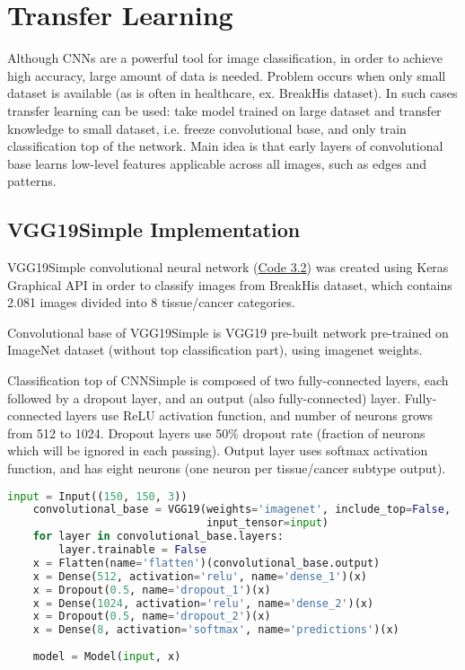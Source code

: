 \section{Transfer Learning}
\label{vgg19}

Although CNNs are a powerful tool for image classification, in order to achieve high accuracy, large amount of data is needed. Problem occurs when only small dataset is available (as is often in healthcare, ex. BreakHis dataset). In such cases transfer learning can be used: take model trained on large dataset and transfer knowledge to small dataset, i.e. freeze convolutional base, and only train classification top of the network. Main idea is that early layers of convolutional base learns low-level features applicable across all images, such as edges and patterns.

\subsection{VGG19Simple Implementation}

VGG19Simple convolutional neural network (\textcolor{red}{\hyperref[src:py2]{Code 3.2}}) was created using Keras Graphical API in order to classify images from BreakHis dataset, which contains 2.081 images divided into 8 tissue/cancer categories. 

Convolutional base of VGG19Simple is VGG19 pre-built network pre-trained on ImageNet dataset (without top classification part), using imagenet weights.

Classification top of CNNSimple is composed of two fully-connected layers, each followed by a dropout layer, and an output (also fully-connected) layer. Fully-connected layers use ReLU activation function, and number of neurons grows from 512 to 1024. Dropout layers use 50\% dropout rate (fraction of neurons which will be ignored in each passing). Output layer uses softmax activation function, and has eight neurons (one neuron per tissue/cancer subtype output). 

\vspace{3mm}
\begin{lstlisting}[language={Python}, basicstyle=\scriptsize]
	input = Input((150, 150, 3))
	convolutional_base = VGG19(weights='imagenet', include_top=False,
	                           input_tensor=input)
	for layer in convolutional_base.layers:
		layer.trainable = False
	x = Flatten(name='flatten')(convolutional_base.output)
	x = Dense(512, activation='relu', name='dense_1')(x)
	x = Dropout(0.5, name='dropout_1')(x)
	x = Dense(1024, activation='relu', name='dense_2')(x)
	x = Dropout(0.5, name='dropout_2')(x)
	x = Dense(8, activation='softmax', name='predictions')(x)
	
	model = Model(input, x)
\end{lstlisting} 

